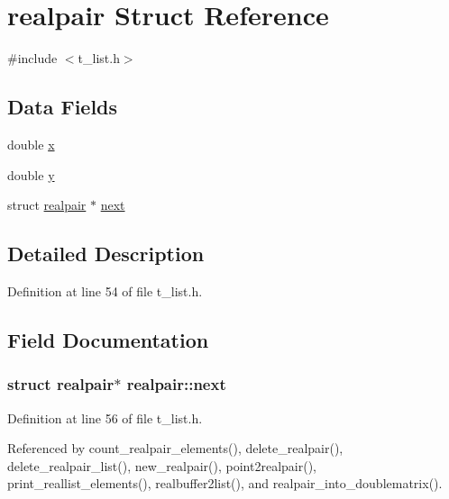 \hypertarget{structrealpair}{\section{realpair Struct Reference}
\label{structrealpair}
}


{\ttfamily \#include $<$t\-\_\-list.\-h$>$}

\subsection*{Data Fields}
\begin{DoxyCompactItemize}
\item 
double \hyperlink{structrealpair_a110bbac8d66e38f6859091feaef0ed10}{x}
\item 
double \hyperlink{structrealpair_a3a0afaddf0ea65c8912d10ac76224768}{y}
\item 
struct \hyperlink{structrealpair}{realpair} $\ast$ \hyperlink{structrealpair_abbebaf16dc54603c2f72158b80e2f8c7}{next}
\end{DoxyCompactItemize}


\subsection{Detailed Description}


Definition at line 54 of file t\-\_\-list.\-h.



\subsection{Field Documentation}
\hypertarget{structrealpair_abbebaf16dc54603c2f72158b80e2f8c7}{
\subsubsection[{next}]{\setlength{\rightskip}{0pt plus 5cm}struct {\bf realpair}$\ast$ realpair\-::next}}\label{structrealpair_abbebaf16dc54603c2f72158b80e2f8c7}


Definition at line 56 of file t\-\_\-list.\-h.



Referenced by count\-\_\-realpair\-\_\-elements(), delete\-\_\-realpair(), delete\-\_\-realpair\-\_\-list(), new\-\_\-realpair(), point2realpair(), print\-\_\-reallist\-\_\-elements(), realbuffer2list(), and realpair\-\_\-into\-\_\-doublematrix().

